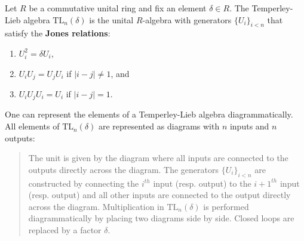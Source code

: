     \begin{example}
        Let $R$ be a commutative unital ring and fix an element $\delta\in R$. The Temperley-Lieb algebra $\mathrm{TL}_n(\delta)$ is the unital $R$-algebra with generators $\{U_i\}_{i<n}$ that satisfy the \textbf{Jones relations}:
        \begin{enumerate}
            \item $U_i^2 = \delta U_i$,
            \item $U_i U_j = U_j U_i$ if $|i-j|\neq 1$, and
            \item $U_i U_j U_i = U_i$ if $|i-j| = 1$.
        \end{enumerate}
        One can represent the elements of a Temperley-Lieb algebra diagrammatically. All elements of $\mathrm{TL}_n(\delta)$ are represented as diagrams with $n$ inputs and $n$ outputs:
        \begin{quote}
            The unit is given by the diagram where all inputs are connected to the outputs directly across the diagram. The generators $\{U_i\}_{i<n}$ are constructed by connecting the $i^{th}$ input (resp. output) to the $i+1^{th}$ input (resp. output) and all other inputs are connected to the output directly across the diagram. Multiplication in $\text{TL}_n(\delta)$ is performed diagrammatically by placing two diagrams side by side. Closed loops are replaced by a factor $\delta$.
        \end{quote}


\end{example}

